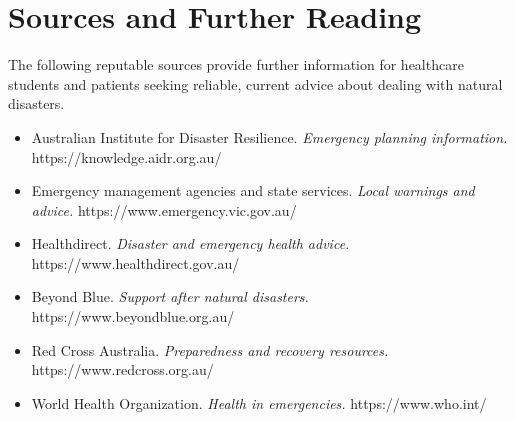 \section*{Sources and Further Reading}
The following reputable sources provide further information for healthcare students and patients seeking reliable, current advice about dealing with natural disasters.

\begin{itemize}
    \item Australian Institute for Disaster Resilience. \textit{Emergency planning information.} https://knowledge.aidr.org.au/
    \item Emergency management agencies and state services. \textit{Local warnings and advice.} https://www.emergency.vic.gov.au/
    \item Healthdirect. \textit{Disaster and emergency health advice.} https://www.healthdirect.gov.au/
    \item Beyond Blue. \textit{Support after natural disasters.} https://www.beyondblue.org.au/
    \item Red Cross Australia. \textit{Preparedness and recovery resources.} https://www.redcross.org.au/
    \item World Health Organization. \textit{Health in emergencies.} https://www.who.int/
\end{itemize}
